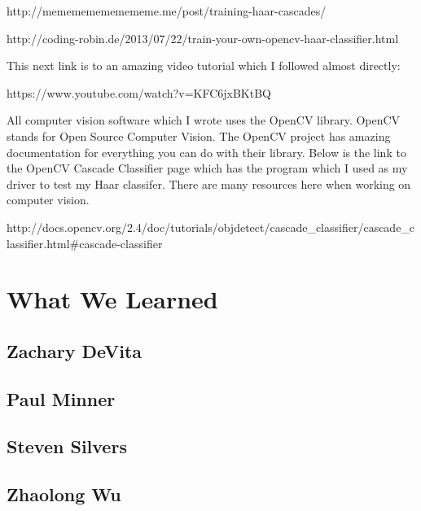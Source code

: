 \documentclass[10pt,letterpaper,onecolumn,draftclsnofoot,journal]{IEEEtran}
\begin{document}
\par
http://memememememememe.me/post/training-haar-cascades/
\par
http://coding-robin.de/2013/07/22/train-your-own-opencv-haar-classifier.html\vspace{.3cm}
\par
This next link is to an amazing video tutorial which I followed almost directly:\vspace{.3cm}
\par
https://www.youtube.com/watch?v=KFC6jxBKtBQ\vspace{.3cm}
\par
All computer vision software which I wrote uses the OpenCV library. OpenCV stands for Open Source Computer Vision. The OpenCV project has amazing documentation for everything you can do with their library. Below is the link to the OpenCV Cascade Classifier page which has the program which I used as my driver to test my Haar classifer. There are many resources here when working on computer vision.\vspace{.3cm}
\par   
http://docs.opencv.org/2.4/doc/tutorials/objdetect/cascade\_classifier/cascade\_classifier.html\#cascade-classifier

\section{\textbf{What We Learned}}

\subsection{\textbf{Zachary DeVita}}

\subsection{\textbf{Paul Minner}}

\subsection{\textbf{Steven Silvers}}

\subsection{\textbf{Zhaolong Wu}}
\end{document}
